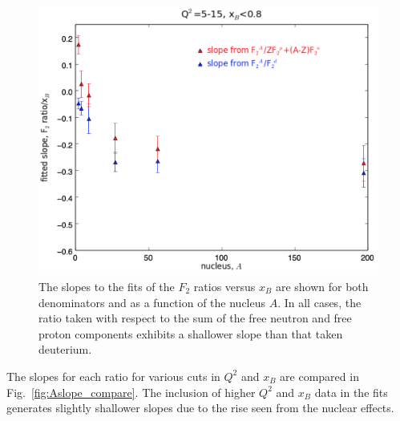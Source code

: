 \documentclass[oneside]{article}
\begin{document}
\begin{figure}[H]
\begin{minipage}{0.5\textwidth}
\includegraphics[width=\textwidth]{plots/plotsvA/Aslope_all.png}
\end{minipage}
  \caption[]{The slopes to the fits of the $F_2$ ratios versus $x_B$ are shown for both denominators and as a function of the nucleus $A$. In all cases,  the ratio taken with respect to the sum of the free neutron and free proton components exhibits a shallower slope than that taken deuterium.}
  \label{fig:Aslope_summary}
\end{figure}   

The slopes for each ratio for various cuts in $Q^2$ and $x_B$ are compared in Fig.~\ref{fig:Aslope_compare}. The inclusion of higher $Q^2$ and $x_B$ data in the fits generates slightly shallower slopes due to the rise seen from the nuclear effects. 
\end{document}
